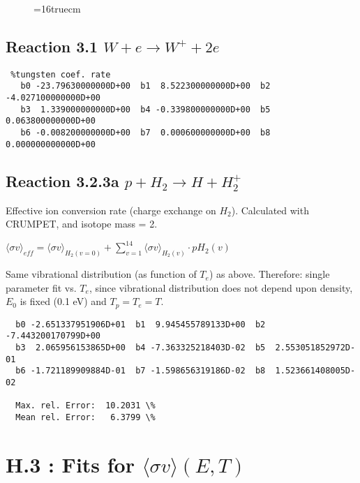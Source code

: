 \documentclass[12pt,dvipdfmx]{article}
\begin{document}
\begin{figure} \label{2.26B}
\epsfxsize=16truecm
\end{figure}

\subsection{
Reaction 3.1 $W + e \rightarrow W^+ + 2e $ }

\begin{small}\begin{verbatim} %tungsten coef. rate
   b0 -23.79630000000D+00  b1  8.522300000000D+00  b2 -4.027100000000D+00
   b3  1.339000000000D+00  b4 -0.339800000000D+00  b5  0.063800000000D+00
   b6 -0.008200000000D+00  b7  0.000600000000D+00  b8  0.000000000000D+00
\end{verbatim}\end{small}

\newpage

\subsection{
Reaction 3.2.3a   $p + H_2 \rightarrow H + H_2^+  $
}

  Effective ion conversion rate (charge exchange on $H_2$). Calculated with CRUMPET, and isotope mass = 2. 

  $ \langle\sigma v \rangle_{eff} = \langle\sigma v \rangle_{H_2(v=0)} + \sum_{v=1}^{14}
\langle\sigma v \rangle_{H_2(v)} \cdot pH_2(v) $

  Same vibrational distribution (as function of $T_e$) as above.
  Therefore:
  single parameter fit vs. $T_e$,
  since vibrational distribution does not depend upon density, $E_0$ is fixed
  (0.1 eV) and $T_p = T_e = T$.

\begin{small}\begin{verbatim}
  b0 -2.651337951906D+01  b1  9.945455789133D+00  b2 -7.443200170799D+00
  b3  2.065956153865D+00  b4 -7.363325218403D-02  b5  2.553051852972D-01
  b6 -1.721189909884D-01  b7 -1.598656319186D-02  b8  1.523661408005D-02

  Max. rel. Error:  10.2031 \%
  Mean rel. Error:   6.3799 \%

\end{verbatim}\end{small}
\newpage

\section{H.3 : Fits for $\langle\sigma v \rangle (E,T)$}\label{sect3}
\end{document}
